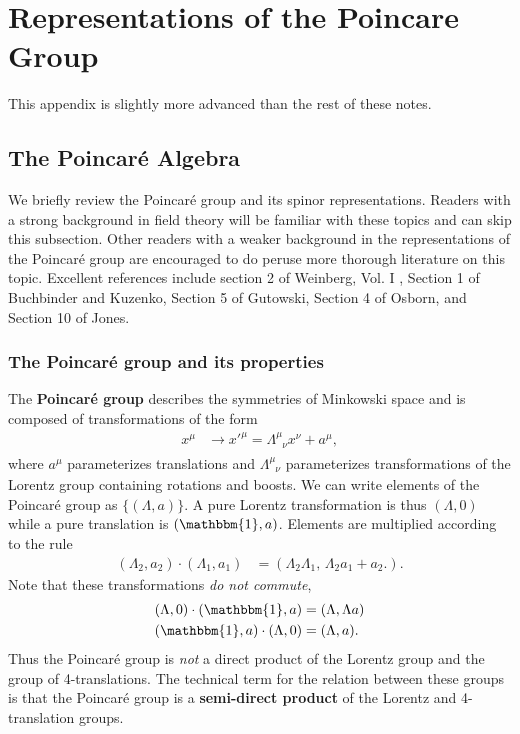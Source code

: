 \documentclass[12pt, oneside]{report}    %
\let\oldsection\section
\def\section{%
  \setcounter{sidenote}{1}%
  \oldsection
}
\begin{document}
\chapter{Representations of the Poincare Group}

This appendix is slightly more advanced than the rest of these notes.

\section{The Poincar\'e Algebra}
\label{sec:Poincare:Algebra}
% 
We briefly review the Poincar\'e group and its spinor representations. 
%
Readers with a strong background in field theory will be familiar with these topics and can skip this subsection. Other readers with a weaker background in the representations of the Poincar\'e group are encouraged to do peruse more thorough literature on this topic. Excellent references include section 2 of Weinberg, Vol. I \autocite{weinberg}, Section 1 of Buchbinder and Kuzenko\autocite{Buchbinder:1998qv}, Section 5 of Gutowski\autocite{gutowski}, Section 4 of Osborn\autocite{Osborn:Symmetries}, and Section 10 of Jones\autocite{JonesGroups}. 

\subsection{The Poincar\'e group and its properties}

The \textbf{Poincar\'e group} describes the symmetries of Minkowski space and is composed of transformations of the form
\begin{align}
    x^\mu &\rightarrow x'^\mu = \Lambda^\mu_{\phantom{\mu}\nu} x^\nu + a^\mu,
\end{align}
where $a^\mu$ parameterizes translations and $\Lambda^\mu_{\phantom{\mu}\nu}$ parameterizes transformations of the Lorentz group  containing rotations and boosts. 
%
We can write elements of the Poincar\'e group as $\{(\Lambda,a)\}$. A pure Lorentz transformation is thus $(\Lambda,0)$ while a pure translation is $(\mathbbm{1},a)$. 
%
Elements are multiplied according to the rule
\begin{align}
    (\Lambda_2,a_2)\cdot(\Lambda_1,a_1) &= (\Lambda_2\Lambda_1,\,\Lambda_2 a_1 + a_2.).\label{eq:SUSYalg:Poincar\'e:multiplication}
\end{align}
%
Note that these transformations \textit{do not commute},
\begin{align}
    (\Lambda,0)\cdot (\mathbbm{1},a) &= (\Lambda,\Lambda a)\\
    (\mathbbm{1},a)\cdot(\Lambda,0) &= (\Lambda,a).
\end{align}
Thus the Poincar\'e group is \textit{not} a direct product of the Lorentz group and the group of 4-translations. The technical term for the relation between these groups is that the Poincar\'e group is a \textbf{semi-direct product} of the Lorentz and 4-translation groups.
\end{document}
